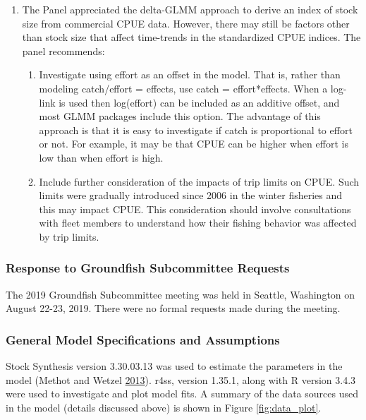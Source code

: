 \documentclass[12pt,]{article}
\begin{document}
\begin{enumerate}
\item The Panel appreciated the delta-GLMM approach to derive an index of stock size from commercial CPUE data. However, there may still be factors other than stock size that affect time-trends in the standardized CPUE indices. The panel recommends:
\begin{enumerate}

\item Investigate using effort as an offset in the model. That is, rather than modeling catch/effort = effects, use catch = effort*effects. When a log-link is used then
log(effort) can be included as an additive offset, and most GLMM packages include this option. The advantage of this approach is that it is easy to investigate if catch is proportional to effort or not. For example, it may be that CPUE can be higher when effort is low than when effort is high.

\item Include further consideration of the impacts of trip limits on CPUE. Such limits were gradually introduced since 2006 in the winter fisheries and this may impact CPUE. This consideration should involve consultations with fleet members to understand how their fishing behavior was affected by trip limits.

\end{enumerate}

\end{enumerate}

\subsubsection{Response to Groundfish Subcommittee
Requests}\label{response-to-groundfish-subcommittee-requests}

The 2019 Groundfish Subcommittee meeting was held in Seattle, Washington
on August 22-23, 2019. There were no formal requests made during the
meeting.

\subsubsection{General Model Specifications and
Assumptions}\label{general-model-specifications-and-assumptions}

Stock Synthesis version 3.30.03.13 was used to estimate the parameters
in the model (Methot and Wetzel
\protect\hyperlink{ref-methot_stock_2013}{2013}). r4ss, version 1.35.1,
along with R version 3.4.3 were used to investigate and plot model fits.
A summary of the data sources used in the model (details discussed
above) is shown in Figure \ref{fig:data_plot}.
\end{document}
